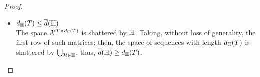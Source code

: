 \begin{proof}
\begin{itemize}
        \item  $ d_{\mathbb{H}}(T) \leq \overline{d}(\mathbb{H})$ \\
        The space 
        $\mathcal{X}^{T \times d_{\mathbb{H}}(T)}$ is shattered by $\mathbb{H}$. 
        Taking, without loss of generality, the first row of such matrices; 
        then, the space of sequences with length $d_{\mathbb{H}}(T)$ is shattered by $\bigcup_{\mathcal{H} \in \mathbb{H}}$, thus, $\overline{d}(\mathbb{H}) \geq d_{\mathbb{H}}(T)$.


    \end{itemize}
\end{proof}


